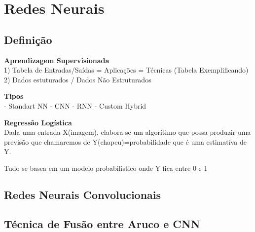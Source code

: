 \chapter{Redes Neurais}

\section{Definição}
\textbf{Aprendizagem Supervisionada} \\
1) Tabela de Entradas/Saídas = Aplicações = Técnicas (Tabela Exemplificando)
2) Dados estuturados / Dados Não Estruturados
 
 \textbf{Tipos} \\
 - Standart NN
 - CNN
 - RNN
 - Custom Hybrid
 
 \textbf{Regressão Logística} \\
 Dada uma entrada X(imagem), elabora-se um algorítimo que possa produzir uma previsão que chamaremos de Y(chapeu)=probabilidade que é uma estimatíva de Y.
 
 Tudo se basea em um modelo probabilistico onde Y fica entre 0 e 1
 
 
    
\section{Redes Neurais Convolucionais}

\section{Técnica de Fusão entre Aruco e CNN}

